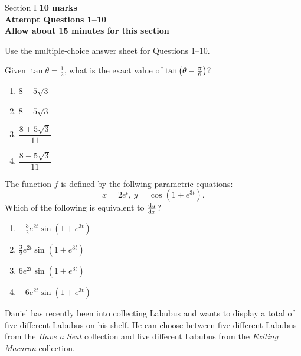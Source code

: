 \documentclass[12pt]{extarticle}
\begin{document}


\begin{sectionheader}{Section I}
	\textbf{10 marks\\
		Attempt Questions 1--10\\
		Allow about 15 minutes for this section}

	Use the multiple-choice answer sheet for Questions 1--10.
\end{sectionheader}
\begin{multiplechoice}
	\item Given $\tan\theta=\frac{1}{2}$, what is the exact value of $\tan\qty(\theta-\frac{\pi}{6})$?
	\begin{enumerate}
		\item $8+5\sqrt{3}$
		\item $8-5\sqrt{3}$
		\item $\dfrac{8+5\sqrt{3}}{11}$
		\item $\dfrac{8-5\sqrt{3}}{11}$
	\end{enumerate}

	\item The function $f$ is defined by the follwing parametric equations:
	\[x = 2e^t,\, y = \cos(1+e^{3t}).\]
	Which of the following is equivalent to $\dv{y}{x}$?
	\begin{enumerate}
		\item $-\frac{3}{2}e^{2t}\sin(1+e^{3t})$
		\item $\frac{3}{2}e^{2t}\sin(1+e^{3t})$
		\item $6e^{2t}\sin(1+e^{3t})$
		\item $-6e^{2t}\sin(1+e^{3t})$
	\end{enumerate}
	\pagebreak
	\item Daniel has recently been into collecting Labubus and wants to display a total of five different Labubus on his shelf.
	He can choose between five different Labubus from the \textit{Have a Seat} collection and five different Labubus from the \textit{Exiting Macaron} collection.


\end{multiplechoice}
\end{document}
